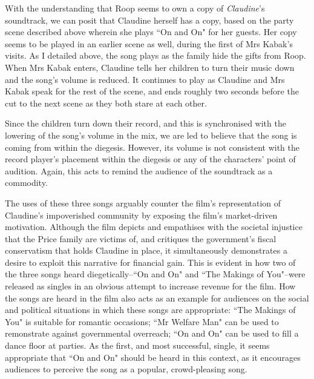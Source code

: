 With the understanding that Roop seems to own a copy of \textit{Claudine}'s soundtrack, we can posit that Claudine herself has a copy, based on the party scene described above wherein she plays ``On and On" for her guests.
Her copy seems to be played in an earlier scene as well, during the first of Mrs Kabak's visits.
As I detailed above, the song plays as the family hide the gifts from Roop.
When Mrs Kabak enters, Claudine tells her children to turn their music down and the song's volume is reduced.
It continues to play as Claudine and Mrs Kabak speak for the rest of the scene, and ends roughly two seconds before the cut to the next scene as they both stare at each other.

Since the children turn down their record, and this is synchronised with the lowering of the song's volume in the mix, we are led to believe that the song is coming from within the diegesis.
However, its volume is not consistent with the record player's placement within the diegesis or any of the characters' point of audition.
Again, this acts to remind the audience of the soundtrack as a commodity.

The uses of these three songs arguably counter the film's representation of Claudine's impoverished community by exposing the film's market-driven motivation.
Although the film depicts and empathises with the societal injustice that the Price family are victims of, and critiques the government's fiscal conservatism that holds Claudine in place, it simultaneously demonstrates a desire to exploit this narrative for financial gain.
This is evident in how two of the three songs heard diegetically–``On and On" and ``The Makings of You"–were released as singles in an obvious attempt to increase revenue for the film.
How the songs are heard in the film also acts as an example for audiences on the social and political situations in which these songs are appropriate: ``The Makings of You" is suitable for romantic occasions; ``Mr Welfare Man" can be used to remonstrate against governmental overreach; ``On and On" can be used to fill a dance floor at parties.
As the first, and most successful, single, it seems appropriate that ``On and On" should be heard in this context, as it encourages audiences to perceive the song as a popular, crowd-pleasing song.

